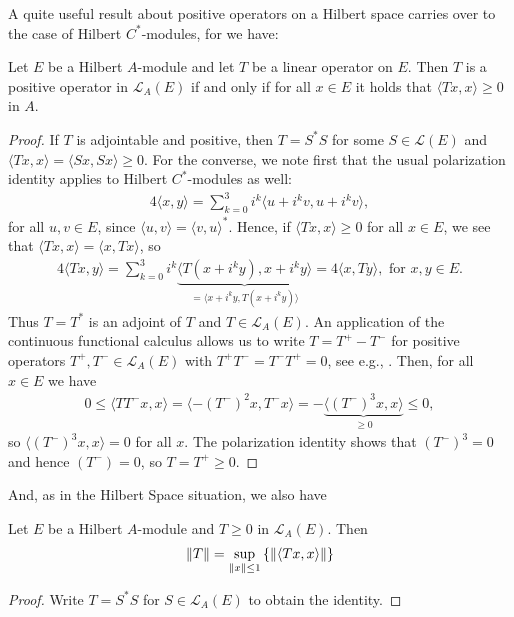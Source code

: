 A quite useful result about positive operators on a Hilbert space carries over to the case of Hilbert $C^*$-modules, for we have:
\begin{lemma}
	Let $E$ be a Hilbert $A$-module and let $T$ be a linear operator on $E$. Then $T$ is a positive operator in $\mathcal{L}_A(E)$ if and only if for all $x \in E$ it holds that $\langle Tx,x \rangle \geq 0$ in $A$.
\end{lemma}
\begin{proof}
	If $T$ is adjointable and positive, then $T=S^*S$ for some $S \in \mathcal{L}(E)$ and $\langle Tx,x\rangle = \langle Sx,Sx\rangle\geq 0$. For the converse, we note first that the usual polarization identity applies to Hilbert $C^*$-modules as well:
	\begin{align*}
		4\langle x, y\rangle = \sum_{k=0}^3 i^{k} \langle u+i^kv,u+i^kv\rangle,
	\end{align*}
	for all $u,v \in E$, since $ \langle u,v \rangle = \langle v,u\rangle ^*$. Hence, if $\langle Tx , x \rangle \geq 0$ for all $x \in E$, we see that $\langle Tx,x\rangle = \langle x,Tx\rangle$, so
	\begin{align*}
		4 \langle Tx,y\rangle = \sum_{k=0}^3 i^k \underbrace{\langle T(x+i^ky),x+i^ky\rangle}_{=\langle x+i^ky,T(x+i^ky)\rangle} = 4 \langle x,Ty\rangle, \text{ for } x,y \in E.
	\end{align*}
	Thus $T=T^*$ is an adjoint of $T$ and $T \in \mathcal{L}_A(E)$. An application of the continuous functional calculus allows us to write $T=T^+-T^-$ for positive operators $T^+,T^- \in \mathcal{L}_A(E)$ with $T^+T^-=T^-T^+=0$, see e.g., \cite[Theorem 11.2]{zhu}. Then, for all $x \in E$ we have
	\begin{align*}
		0 \leq \langle T T^-x,x \rangle = \langle -(T^-)^2x,T^-x\rangle = -\underbrace{\langle (T^-)^3x,x\rangle}_{\geq 0 } \leq 0,
	\end{align*}
	so $\langle (T^-)^3 x,x \rangle = 0$ for all $x$. The polarization identity shows that $(T^-)^3=0$ and hence $(T^-)=0$, so $T=T^+\geq 0$.
\end{proof}
And, as in the Hilbert Space situation, we also have 
\begin{lemma}
	Let $E$ be a Hilbert $A$-module and $T \geq 0$ in $\mathcal{L}_A(E)$. Then
	\begin{align*}
		\left\lVert T \right\rVert = \sup_{\left\lVert x \right\rVert \leq 1}\left\{ \left\lVert \langle Tx,x\rangle \right\rVert \right\}
	\end{align*}
\end{lemma}
\begin{proof}
	Write $T=S^*S$ for $S \in \mathcal{L}_A(E)$ to obtain the identity.
\end{proof}


